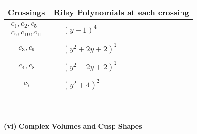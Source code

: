 \documentclass[1p]{elsarticle_modified}
\theoremstyle{definition}
\begin{document}
\begin{tabular}{m{50pt}|m{274pt}}
Crossings & \hspace{64pt}Riley Polynomials at each crossing \\
\hline $$\begin{aligned}c_{1},c_{2},c_{5}\\c_{6},c_{10},c_{11}\end{aligned}$$&$\begin{aligned}
&(y-1)^4
\end{aligned}$\\
\hline $$\begin{aligned}c_{3},c_{9}\end{aligned}$$&$\begin{aligned}
&(y^2+2 y+2)^2
\end{aligned}$\\
\hline $$\begin{aligned}c_{4},c_{8}\end{aligned}$$&$\begin{aligned}
&(y^2-2 y+2)^2
\end{aligned}$\\
\hline $$\begin{aligned}c_{7}\end{aligned}$$&$\begin{aligned}
&(y^2+4)^2
\end{aligned}$\\
\hline
\end{tabular}\\~\\
\newpage\flushleft \textbf{(vi) Complex Volumes and Cusp Shapes}
\end{document}

